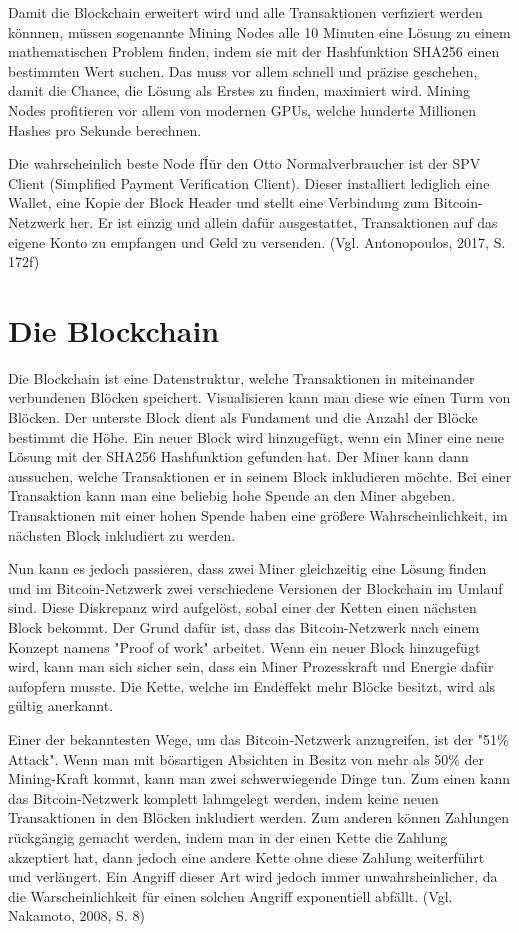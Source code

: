 Damit die Blockchain erweitert wird und alle Transaktionen verfiziert werden könnnen, müssen sogenannte Mining Nodes alle 10 Minuten
eine Lösung zu einem mathematischen Problem finden, indem sie mit der Hashfunktion SHA256 einen bestimmten Wert suchen. Das muss
vor allem schnell und präzise geschehen, damit die Chance, die Lösung als Erstes zu finden, maximiert wird. Mining Nodes 
profitieren vor allem von modernen GPUs, welche hunderte Millionen Hashes pro Sekunde berechnen.

Die wahrscheinlich beste Node fÍür den Otto Normalverbraucher ist der SPV Client (Simplified Payment Verification Client). Dieser
installiert lediglich eine Wallet, eine Kopie der Block Header und stellt eine Verbindung zum Bitcoin-Netzwerk her. Er ist einzig
und allein dafür ausgestattet, Transaktionen auf das eigene Konto zu empfangen und Geld zu versenden. (Vgl. Antonopoulos, 2017, S. 172f)


\section{Die Blockchain}
Die Blockchain ist eine Datenstruktur, welche Transaktionen in miteinander verbundenen Blöcken speichert. Visualisieren kann man
diese wie einen Turm von Blöcken. Der unterste Block dient als Fundament und die Anzahl der Blöcke bestimmt die Höhe. Ein neuer
Block wird hinzugefügt, wenn ein Miner eine neue Lösung mit der SHA256 Hashfunktion gefunden hat. Der Miner kann dann aussuchen,
welche Transaktionen er in seinem Block inkludieren möchte. Bei einer Transaktion kann man eine beliebig hohe Spende an den Miner
abgeben. Transaktionen mit einer hohen Spende haben eine größere Wahrscheinlichkeit, im nächsten Block inkludiert zu werden.

Nun kann es jedoch passieren, dass zwei Miner gleichzeitig eine Lösung finden und im Bitcoin-Netzwerk zwei verschiedene Versionen
der Blockchain im Umlauf sind. Diese Diskrepanz wird aufgelöst, sobal einer der Ketten einen nächsten Block bekommt. Der Grund
dafür ist, dass das Bitcoin-Netzwerk nach einem Konzept namens "Proof of work" arbeitet. Wenn ein neuer Block hinzugefügt wird,
kann man sich sicher sein, dass ein Miner Prozesskraft und Energie dafür aufopfern musste. Die Kette, welche im Endeffekt mehr
Blöcke besitzt, wird als gültig anerkannt.

Einer der bekanntesten Wege, um das Bitcoin-Netzwerk anzugreifen, ist der "51\% Attack". Wenn man mit bösartigen Absichten
in Besitz von mehr als 50\% der Mining-Kraft kommt, kann man zwei schwerwiegende Dinge tun. Zum einen kann das Bitcoin-Netzwerk
komplett lahmgelegt werden, indem keine neuen Transaktionen in den Blöcken inkludiert werden. Zum anderen können Zahlungen
rückgängig gemacht werden, indem man in der einen Kette die Zahlung akzeptiert hat, dann jedoch eine andere Kette ohne diese 
Zahlung weiterführt und verlängert. Ein Angriff dieser Art wird jedoch immer unwahrsheinlicher, da die Warscheinlichkeit für
einen solchen Angriff exponentiell abfällt. (Vgl. Nakamoto, 2008, S. 8)

